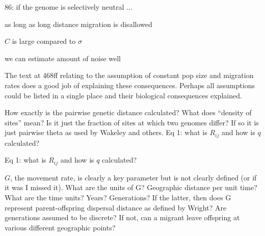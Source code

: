 \begin{point}{86:}
      if the genome is selectively neutral ...
\end{point}

\reply{
}

\begin{point}{\revref}
     as long as long distance migration is disallowed
\end{point}


\begin{point}{\revref}
     $C$ is large compared to $\sigma$
\end{point}

\reply{
}

\begin{point}{\revref}
     we can estimate amount of noise well
\end{point}

\reply{
}

\begin{point}{}
    The text at 468ff relating to the assumption of constant pop size and migration
    rates does a good job of explaining these consequences.  Perhaps all
    assumptions could be listed in a single place and their biological
    consequences explained.
\end{point}

\reply{
}

\begin{point}{\revref}
    How exactly is the pairwise genetic distance calculated?  What does ``density
    of sites'' mean?  Is it just the fraction of sites at which two genomes
    differ?  If so it is just pairwise theta as used by Wakeley and others.  
    Eq 1:  what is $R_{ij}$ and how is $q$ calculated?
\end{point}


\begin{point}{}
    Eq 1:  what is $R_{ij}$ and how is $q$ calculated?
\end{point}

\reply{
}

\begin{point}{}
    $G$, the movement rate, is clearly a key parameter but is not clearly defined (or
    if it was I missed it).  What are the units of G?  Geographic distance per
    unit time?  What are the time units?  Years?  Generations?  If the latter,
    then does G represent parent-offspring dispersal distance as defined by
    Wright?  Are generations assumed to be discrete?  If not, can a migrant
    leave offspring at various different geographic points?
\end{point}

